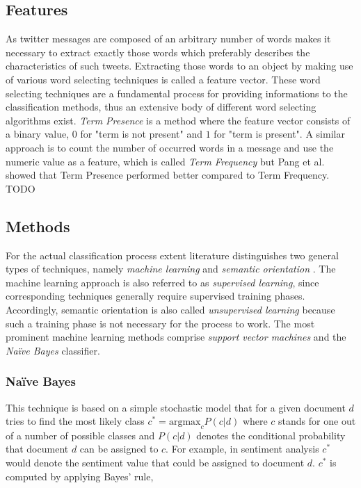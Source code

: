 \subsection{Features}
As twitter messages are composed of an arbitrary number of words makes it necessary to extract exactly those words which preferably describes the characteristics of such tweets. Extracting those words to an object by making use of various word selecting techniques is called a feature vector. These word selecting techniques are a fundamental process for providing informations to the classification methods, thus an extensive body of different word selecting algorithms exist. 
	\emph{Term Presence} is a method where the feature vector consists of a binary value, $0$ for "term is not present" and $1$ for "term is present". A similar approach is to count the number of occurred words in a message and use the numeric value as a feature, which is called \emph{Term Frequency} but Pang et al. showed \autocite{Pang2008} that Term Presence performed better compared to Term Frequency.
TODO

\subsection{Methods}

For the actual classification process extent literature distinguishes two general types of techniques, namely \emph{machine learning} and \emph{semantic orientation} \cite{Ye20096527}. The machine learning approach is also referred to as \emph{supervised learning}, since corresponding techniques generally require supervised training phases. Accordingly, semantic orientation is also called \emph{unsupervised learning} because such a training phase is not necessary for the process to work. The most prominent machine learning methods comprise \emph{support vector machines} and the \emph{Na\"ive Bayes} classifier.

\subsubsection*{Na\"ive Bayes}

This technique is based on a simple stochastic model that for a given document $d$ tries to find the most likely class $c^* = \mathrm{arg max}_c P(c \vert d)$ where $c$ stands for one out of a number of possible classes and $P(c \vert d)$ denotes the conditional probability that document $d$ can be assigned to $c$. For example, in sentiment analysis $c^*$ would denote the sentiment value that could be assigned to document $d$. $c^*$ is computed by applying Bayes' rule,

